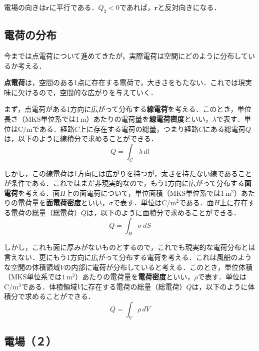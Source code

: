 電場の向きは$\bm{r}$に平行である．$Q_2 < 0$であれば，$\bm{r}$と反対向きになる．



\subsection{電荷の分布}

今までは点電荷について進めてきたが，実際電荷は空間にどのように分布しているか考える．

\textbf{点電荷}は，空間のある1点に存在する電荷で，大きさをもたない．これでは現実味に欠けるので，空間的な広がりを与えていく．

まず，点電荷がある1方向に広がって分布する\textbf{線電荷}を考える．このとき，単位長さ（MKS単位系では$1\,\mathrm{m}$）あたりの電荷量を\textbf{線電荷密度}といい，$\lambda$で表す．単位は$\mathrm{C / m}$である．経路$C$上に存在する電荷の総量，つまり経路$C$にある総電荷$Q$は，以下のように線積分で求めることができる．
\begin{equation}
	Q = \int_{C} \lambda\,dl
\end{equation}

しかし，この線電荷は1方向には広がりを持つが，太さを持たない線であることが条件である．これではまだ非現実的なので，もう1方向に広がって分布する\textbf{面電荷}を考える．面$H$上の面電荷について，単位面積（MKS単位系では$1\,\mathrm{m^2}$）あたりの電荷量を\textbf{面電荷密度}といい，$\sigma$で表す．単位は$\mathrm{C / m^2}$である．面$H$上に存在する電荷の総量（総電荷）$Q$は，以下のように面積分で求めることができる．
\begin{equation}
	Q = \int_{H} \sigma\,dS
\end{equation}

しかし，これも面に厚みがないものとするので，これでも現実的な電荷分布とは言えない．更にもう1方向に広がって分布する電荷を考える．これは風船のような空間の体積領域$V$の内部に電荷が分布していると考える．このとき，単位体積（MKS単位系では$1\,\mathrm{m^3}$）あたりの電荷量を\textbf{電荷密度}といい，$\rho$で表す．単位は$\mathrm{C / m^3}$である．体積領域$V$に存在する電荷の総量（総電荷）$Q$は，以下のように体積分で求めることができる．
\begin{equation}
	Q = \int_{V} \rho\,dV \label{equ:DJ1-4}
\end{equation}



\subsection{電場（２）}


